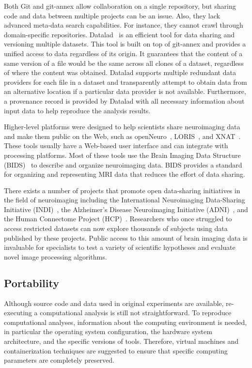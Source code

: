 Both Git and git-annex allow collaboration on a single 
repository, but sharing code and data between multiple projects can be an 
issue. Also, they lack advanced meta-data search 
capabilities. For instance, they cannot crawl through domain-specific repositories.
Datalad~\cite{datalad} is an 
efficient tool for data sharing and versioning 
multiple datasets. This tool is built on top of git-annex and provides 
a unified access to data regardless of its origin. It guarantees 
that the content of a same version of a file would be the same across all 
clones of a dataset, regardless of where the content was obtained. 
Datalad supports multiple redundant data providers for each file in a 
dataset and transparently attempt to obtain data from an 
alternative location if a particular data provider is not available. 
Furthermore, a provenance record is provided by Datalad with all 
necessary information about input data to help reproduce the analysis 
results. 

Higher-level platforms were designed to help 
scientists share neuroimaging data and make them public on the Web, such as 
openNeuro~\cite{gorgolewski2017openneuro}, LORIS~\cite{das2012loris}, 
and XNAT~\cite{marcus2007extensible}. 
These tools usually have a Web-based user interface and can 
integrate with processing platforms. Most of these tools use the 
Brain Imaging Data Structure (BIDS)~\cite{gorgolewski2016brain} to 
describe and organize neuroimaging data. BIDS provides a 
standard for organizing and representing MRI data that reduces the 
effort of data sharing. 

There exists a number of projects that promote open 
data-sharing initiatives in the field of neuroimaging including the 
International Neuroimaging Data-Sharing Initiative 
(INDI)~\cite{mennes2013making, milham2012open}, the Alzheimer’s Disease 
Neuroimaging Initiative (ADNI)~\cite{jack2008alzheimer}, and the Human 
Connectome Project (HCP)~\cite{van2012human}. Researchers who once struggled
to access restricted datasets can now explore thousands of subjects
using data published by these projects.
Public access to this amount of brain imaging data is
invaluable for specialists to test a variety of scientific hypotheses 
and evaluate novel image processing algorithms. 


\subsection{Portability}

Although source code and data used in original experiments are 
available, re-executing a computational analysis is still not 
straightforward. To reproduce computational analyses, information about the
computing environment is needed, in particular the operating system 
configuration, the hardware system architecture, and the specific versions of 
tools. Therefore, virtual machines and containerization techniques are 
suggested to ensure that specific computing parameters are completely 
preserved. 

